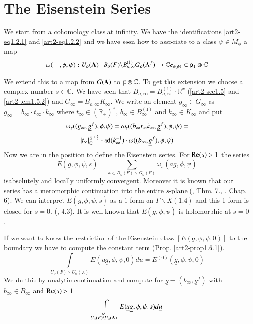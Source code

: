 \section{The Eisenstein Series}\label{art2-sec2}

We start from a cohomology class at infinity. We have the identifications \ref{art2-eq1.2.1} and \ref{art2-eq1.2.2} and we have seen how to associate to a class $\psi\in M_{\phi}$ a map
$$
\omega(\quad,\phi,\psi):U_{o}(\mathbf{A})\cdot B_{o}(F)\backslash B_{o,\infty}^{(1)}G_{o}(\mathbf{A}^{f})\to \mathbb{C} e_{\epsilon(\phi)}\subset \mathsf{p}_{1}\otimes \mathbb{C}
$$

We extend this to a map from $G(\mathbf{A})$ to $\mathsf{p}\otimes \mathbb{C}$. To get this extension we choose a complex number $s\in \mathbb{C}$. We have seen that $B_{o,\infty}=B_{o,\infty}^{(1)}\cdot \mathbb{R}^{x}$ (\ref{art2-sec1.5} and \ref{art2-lem1.5.2}) and $G_{\infty}=B_{o,\infty}K_{\infty}$. We write an element $g_{\infty}\in G_{\infty}$ as $g_{\infty}=b_{\infty}\cdot t_{\infty}\cdot k_{\infty}$ where $t_{\infty}\in (\mathbb{R}_{+})^{x}$, $b_{\infty}\in B^{(1)}_{\infty}$ and $k_{\infty}\in K_{\infty}$ and put
\begin{gather*}
\omega_{s}((g_{\infty},\underline{g}^{f}),\phi,\psi)=\omega_{s}((b_{\infty}t_{\infty}k_{\infty},\underline{g}^{f}),\phi,\psi)=\\
|t_{\infty}|_{\mathbb{C}}^{\frac{1}{2}+\frac{s}{2}}\cdot \operatorname{ad}(k_{\infty}^{-1})\cdot \omega((b_{\infty},\underline{g}^{f}),\phi,\psi)
\end{gather*}
Now we are in the position to define the Eisenstein series. For $\mathrm{Re}(s)>1$ the series
$$
E(\underline{g},\phi,\psi,s)=\sum\limits_{a\in B_{o}(F)\backslash G_{o}(F)}\omega_{s}(a\underline{g},\phi,\psi)
$$
is\pageoriginale absolutely and locally uniformly convergent. Moreover it is known that our series has a meromorphic continuation into the entire $s$-plane (\cite{art2-key9}, Thm. 7., \cite{art2-key13}, Chap. 6). We can interpret $E(\underline{g},\phi,\psi,s)$ as a 1-form on $\Gamma\backslash X(1.4)$ and this 1-form is closed for $s=0$. (\cite{art2-key8}, 4.3). It is well known that $E(\underline{g},\phi,\psi)$ is holomorphic at $s=0$.

If we want to know the restriction of the Eisenstein class $[E(g,\phi,\psi,0)]$ to the boundary we have to compute the constant term (Prop. \ref{art2-prop1.6.1}).
$$
\int\limits_{U_{o}(F)\backslash U_{o}(A)}E(\underline{u}\underline{g},\phi,\psi,0)d\underline{u}=E^{(0)}(\underline{g},\phi,\psi,0)
$$
We do this by analytic continuation and compute for $\underline{g}=(b_{\infty},\underline{g}^{f})$ with $b_{\infty}\in B_{\infty}$ and $\mathrm{Re}(s)>1$
$$
\int\limits_{U_{o}(F)\backslash U_{o}(\mathbf{A})}E(\underline{u}\underline{g},\phi,\psi,s)d\underline{u}
$$

